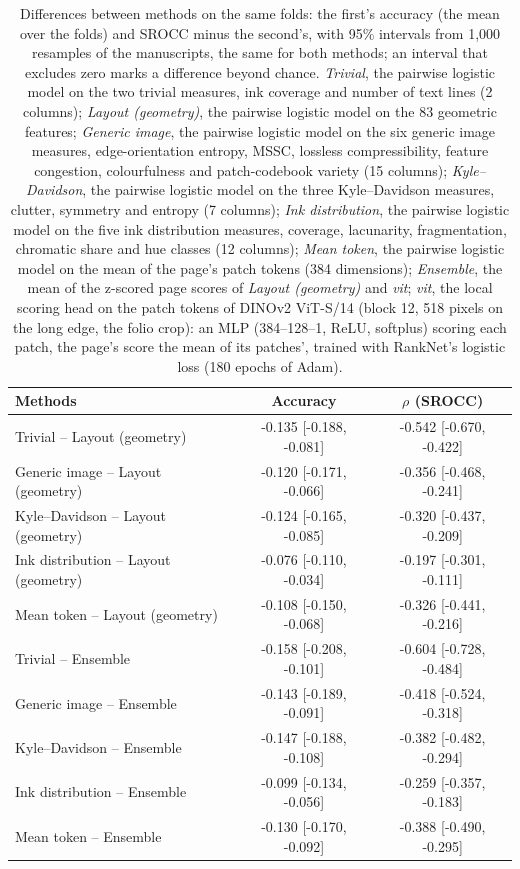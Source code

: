 \begin{table}[htbp]
  \centering
  \caption{Differences between methods on the same folds: the first's accuracy (the mean over the folds) and SROCC minus the second's, with 95\% intervals from 1,000 resamples of the manuscripts, the same for both methods; an interval that excludes zero marks a difference beyond chance. \emph{Trivial}, the pairwise logistic model on the two trivial measures, ink coverage and number of text lines (2 columns); \emph{Layout (geometry)}, the pairwise logistic model on the 83 geometric features; \emph{Generic image}, the pairwise logistic model on the six generic image measures, edge-orientation entropy, MSSC, lossless compressibility, feature congestion, colourfulness and patch-codebook variety (15 columns); \emph{Kyle--Davidson}, the pairwise logistic model on the three Kyle--Davidson measures, clutter, symmetry and entropy (7 columns); \emph{Ink distribution}, the pairwise logistic model on the five ink distribution measures, coverage, lacunarity, fragmentation, chromatic share and hue classes (12 columns); \emph{Mean token}, the pairwise logistic model on the mean of the page's patch tokens (384 dimensions); \emph{Ensemble}, the mean of the z-scored page scores of \emph{Layout (geometry)} and \emph{vit}; \emph{vit}, the local scoring head on the patch tokens of DINOv2 ViT-S/14 (block 12, 518 pixels on the long edge, the folio crop): an MLP (384--128--1, ReLU, softplus) scoring each patch, the page's score the mean of its patches', trained with RankNet's logistic loss (180 epochs of Adam).}
  \label{tab:baseline_differences}
  \begin{tabular}{lcc}
    \toprule
    Methods & Accuracy & $\rho$ (SROCC) \\
    \midrule
    Trivial -- Layout (geometry) & -0.135 [-0.188, -0.081] & -0.542 [-0.670, -0.422] \\
    Generic image -- Layout (geometry) & -0.120 [-0.171, -0.066] & -0.356 [-0.468, -0.241] \\
    Kyle--Davidson -- Layout (geometry) & -0.124 [-0.165, -0.085] & -0.320 [-0.437, -0.209] \\
    Ink distribution -- Layout (geometry) & -0.076 [-0.110, -0.034] & -0.197 [-0.301, -0.111] \\
    Mean token -- Layout (geometry) & -0.108 [-0.150, -0.068] & -0.326 [-0.441, -0.216] \\
    Trivial -- Ensemble & -0.158 [-0.208, -0.101] & -0.604 [-0.728, -0.484] \\
    Generic image -- Ensemble & -0.143 [-0.189, -0.091] & -0.418 [-0.524, -0.318] \\
    Kyle--Davidson -- Ensemble & -0.147 [-0.188, -0.108] & -0.382 [-0.482, -0.294] \\
    Ink distribution -- Ensemble & -0.099 [-0.134, -0.056] & -0.259 [-0.357, -0.183] \\
    Mean token -- Ensemble & -0.130 [-0.170, -0.092] & -0.388 [-0.490, -0.295] \\
    \bottomrule
  \end{tabular}
\end{table}
